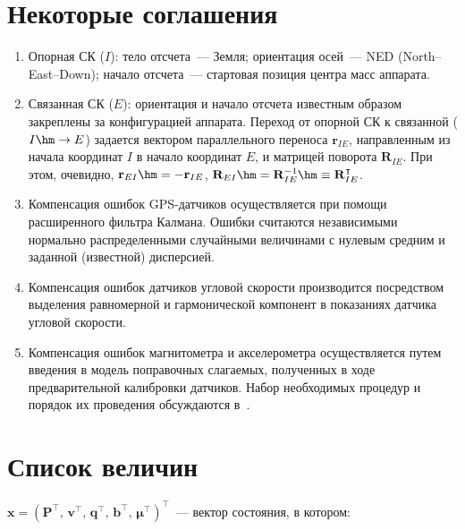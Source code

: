 \documentclass[
  AUTHOR={Симаков, В.А.},
  TITLE={Управление ориентацией беспилотных систем},
  SUBJECT={Проблемы навигации летательных аппаратов},
  SOURCE={./\jobname.zip},
  12pt,oneside]{commart}
\begin{document}
\section*{Некоторые соглашения}

\begin{enumerate}
\item Опорная СК ($I$): тело отсчета~--- Земля; ориентация осей~--- NED (North--East--Down); начало отсчета~--- стартовая позиция центра масс аппарата.
\item Связанная СК ($E$): ориентация и начало отсчета известным образом закреплены за конфигурацией аппарата. Переход от опорной СК к связанной ($I\hm\rightarrow E$) задается вектором параллельного переноса $\mathbf{r}_{IE}$, направленным из начала координат $I$ в начало координат $E$, и матрицей поворота $\mathbf{R}_{IE}$. При этом, очевидно, $\mathbf{r}_{EI}\hm=-\mathbf{r}_{IE}$, $\mathbf{R}_{EI}\hm=\mathbf{R}_{IE}^{-1}\hm\equiv\mathbf{R}_{IE}^{\intercal}$.
\item Компенсация ошибок GPS-датчиков осуществляется при помощи расширенного фильтра Калмана. Ошибки считаются независимыми нормально распределенными случайными величинами с нулевым средним и заданной (известной) дисперсией.
\item Компенсация ошибок датчиков угловой скорости производится посредством выделения равномерной и гармонической компонент в показаниях датчика угловой скорости.
\item Компенсация ошибок магнитометра и акселерометра осуществляется путем введения в модель поправочных слагаемых, полученных в ходе предварительной калибровки датчиков. Набор необходимых процедур и порядок их проведения обсуждаются в~\cite{ivanov,ozyagcilar}.
\end{enumerate}

\section*{Список величин}

$\mathbf{x}=(\mathbf{P}^{\intercal},\,\mathbf{v}^{\intercal},\,\mathbf{q}^{\intercal},\,\mathbf{b}^{\intercal},\,\mathbf{\mu}^{\intercal})^\intercal$~--- вектор состояния, в котором:
\end{document}

